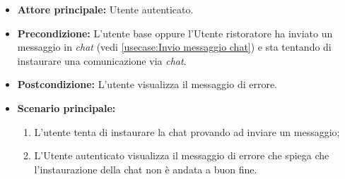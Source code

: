 \label{usecase:Visualizzazione errore instaurazione chat}
\begin{itemize}
    \item \textbf{Attore principale:} Utente autenticato. 

	\item \textbf{Precondizione:}
	L'utente base oppure l'Utente ristoratore ha inviato un messaggio in \textit{chat} (vedi \autoref{usecase:Invio messaggio chat}) e sta tentando di instaurare una comunicazione via \textit{chat}.

	\item \textbf{Postcondizione:}
	      L'utente visualizza il messaggio di errore.

	\item \textbf{Scenario principale:}
	      \begin{enumerate}
		      \item L'utente tenta di instaurare la chat provando ad inviare un messaggio;
		      \item L'Utente autenticato visualizza il messaggio di errore che spiega che l'instaurazione della chat non è andata a buon fine.
	      \end{enumerate}
\end{itemize}